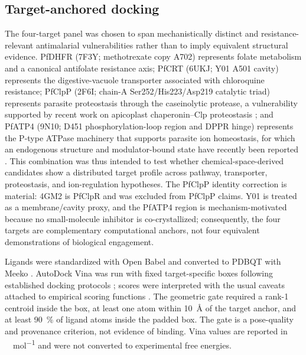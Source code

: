 \documentclass[journal=jcisd8,manuscript=article]{achemso}
\begin{document}
\subsection{Target-anchored docking}
The four-target panel was chosen to span mechanistically distinct and resistance-relevant antimalarial vulnerabilities rather than to imply equivalent structural evidence. PfDHFR (7F3Y; methotrexate copy A702) represents folate metabolism and a canonical antifolate resistance axis; PfCRT (6UKJ; Y01 A501 cavity) represents the digestive-vacuole transporter associated with chloroquine resistance; PfClpP (2F6I; chain-A Ser252/His223/Asp219 catalytic triad) represents parasite proteostasis through the caseinolytic protease, a vulnerability supported by recent work on apicoplast chaperonin--Clp proteostasis \cite{Tissawak2025}; and PfATP4 (9N10; D451 phosphorylation-loop region and DPPR hinge) represents the P-type ATPase machinery that supports parasite ion homeostasis, for which an endogenous structure and modulator-bound state have recently been reported \cite{Haile2025}. This combination was thus intended to test whether chemical-space-derived candidates show a distributed target profile across pathway, transporter, proteostasis, and ion-regulation hypotheses. The PfClpP identity correction is material: 4GM2 is PfClpR and was excluded from PfClpP claims. Y01 is treated as a membrane/cavity proxy, and the PfATP4 region is mechanism-motivated because no small-molecule inhibitor is co-crystallized; consequently, the four targets are complementary computational anchors, not four equivalent demonstrations of biological engagement.

Ligands were standardized with Open Babel \cite{OBoyle2011} and converted to PDBQT with Meeko \cite{Eberhardt2021}. AutoDock Vina was run with fixed target-specific boxes following established docking protocols \cite{Trott2009}; scores were interpreted with the usual caveats attached to empirical scoring functions \cite{Quiroga2016}. The geometric gate required a rank-1 centroid inside the box, at least one atom within \qty{10}{\angstrom} of the target anchor, and at least \qty{90}{\percent} of ligand atoms inside the padded box. The gate is a pose-quality and provenance criterion, not evidence of binding. Vina values are reported in \si{\kilo\calorie\per\mole} and were not converted to experimental free energies.
\end{document}
